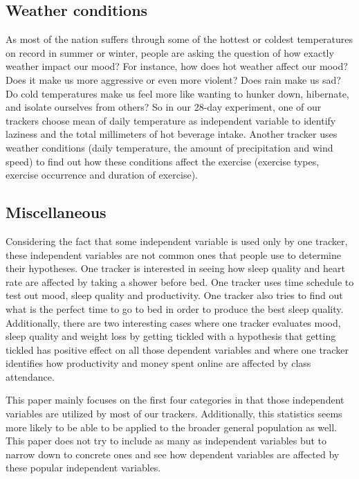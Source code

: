 \subsection{Weather conditions}
As most of the nation suffers through some of the hottest or coldest temperatures on record in summer or winter, people are asking the question of how exactly weather impact our mood? For instance, how does hot weather affect our mood? Does it make us more aggressive or even more violent? Does rain make us sad? Do cold temperatures make us feel more like wanting to hunker down, hibernate, and isolate ourselves from others? So in our 28-day experiment, one of our trackers choose mean of daily temperature as independent variable to identify laziness and the total millimeters of hot beverage intake. Another tracker uses weather conditions (daily temperature, the amount of precipitation and wind speed) to find out how these conditions affect the exercise (exercise types, exercise occurrence and duration of exercise).
\subsection{Miscellaneous}
Considering the fact that some independent variable is used only by one tracker, these independent variables are not common ones that people use to determine their hypotheses. One tracker is interested in seeing how sleep quality and heart rate are affected by taking a shower before bed. One tracker uses time schedule to test out mood, sleep quality and productivity. One tracker also tries to find out what is the perfect time to go to bed in order to produce the best sleep quality. Additionally, there are two interesting cases where one tracker evaluates mood, sleep quality and weight loss by getting tickled with a hypothesis that getting tickled has positive effect on all those dependent variables and where one tracker identifies how productivity and money spent online are affected by class attendance. 

This paper mainly focuses on the first four categories in that those independent variables are utilized by most of our trackers. Additionally, this statistics seems more likely to be able to be applied to the broader general population as well. This paper does not try to include as many as independent variables but to narrow down to concrete ones and see how dependent variables are affected by these popular independent variables. 
